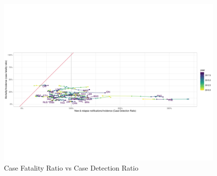 \documentclass[12pt]{article}
\begin{document}
\FloatBarrier


\begin{figure}
\centering
\includegraphics[width=1\textwidth]{../plots/aF8.pdf}
\caption{Case Fatality Ratio vs Case Detection Ratio}
\end{figure}
\end{document}
